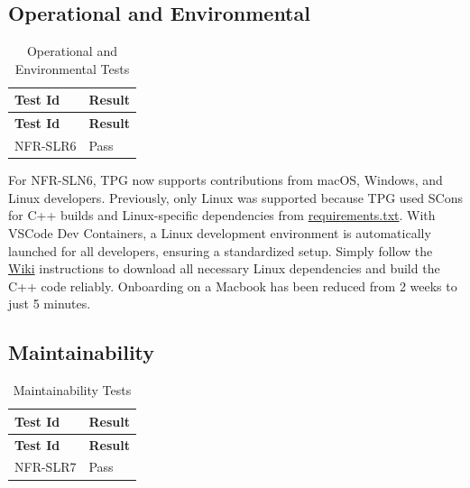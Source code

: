 \documentclass[12pt, titlepage]{article}
\begin{document}
\subsection{Operational and Environmental}\label{operational}

\begin{center}
  \begin{longtable}{|p{4cm}|p{4cm}|}
  \caption{Operational and Environmental Tests} \\
  \hline
  \textbf{Test Id} & \textbf{Result} \\
  \hline
  \endfirsthead
  \hline
  \textbf{Test Id} & \textbf{Result} \\
  \hline
  \endhead
  NFR-SLR6 & Pass \\
  \hline
  \end{longtable}
\end{center}

For NFR-SLN6, TPG now supports contributions from macOS, Windows, and Linux developers.
Previously, only Linux was supported because TPG used SCons for C++ builds and Linux-specific dependencies from \href{https://gitlab.cas.mcmaster.ca/kellys32/tpg/-/blob/main/requirements.txt}{requirements.txt}.
With VSCode Dev Containers, a Linux development environment is automatically launched for all developers, ensuring a standardized setup.
Simply follow the \href{https://gitlab.cas.mcmaster.ca/kellys32/tpg/-/wikis/home}{Wiki} instructions to download all necessary Linux dependencies and build the C++ code reliably. Onboarding on a Macbook has been reduced from 2 weeks to just 5 minutes.


\subsection{Maintainability}\label{maintainability}

  \begin{center}
  \begin{longtable}{|p{4cm}|p{4cm}|}
  \caption{Maintainability Tests} \\
  \hline
  \textbf{Test Id} & \textbf{Result} \\
  \hline
  \endfirsthead
  \hline
  \textbf{Test Id} & \textbf{Result} \\
  \hline
  \endhead
  NFR-SLR7 & Pass \\
  \hline
  \end{longtable}
\end{center}
\end{document}
